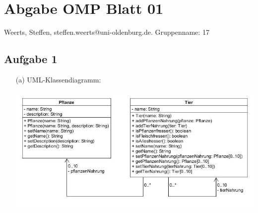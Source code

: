 \documentclass[12pt]{article}
\begin{document}
\section*{Abgabe OMP Blatt 01}
Weerts, Steffen, steffen.weerts@uni-oldenburg.de. Gruppenname: 17
\subsection*{Aufgabe 1}
\begin{enumerate}
	\item[(a)] UML-Klassendiagramm:
	\begin{center}
		\includegraphics[scale=0.5]{OMP_Blatt01_Weerts_Klassendiagramm_a.jpg}
	\end{center}
	

\end{enumerate}
\end{document}
